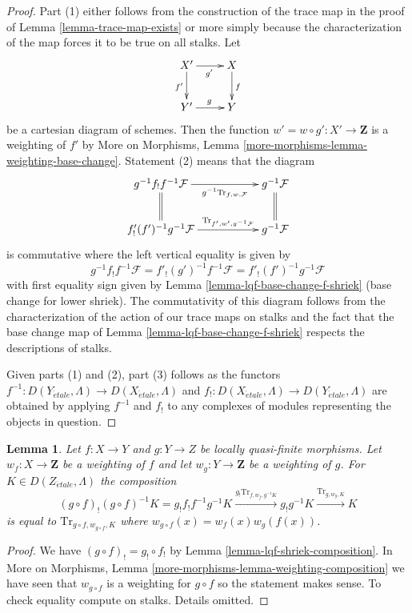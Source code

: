 \documentclass{stacks-project}
\theoremstyle{plain}
\newtheorem{lemma}[subsection]{Lemma}
\theoremstyle{definition}
\theoremstyle{remark}
\numberwithin{equation}{subsection}
\def\etale{{\acute{e}tale}}
\begin{document}
\begin{proof}
Part (1) either follows from the construction of the trace map
in the proof of Lemma \ref{lemma-trace-map-exists}
or more simply because the characterization of the map
forces it to be true on all stalks.
Let
$$
\xymatrix{
X' \ar[r]_{g'} \ar[d]_{f'} & X \ar[d]^f \\
Y' \ar[r]^g & Y
}
$$
be a cartesian diagram of schemes. Then the function
$w' = w \circ g' : X' \to \mathbf{Z}$ is a weighting of $f'$ by
More on Morphisms, Lemma \ref{more-morphisms-lemma-weighting-base-change}.
Statement (2) means that the diagram
$$
\xymatrix{
g^{-1}f_!f^{-1}\mathcal{F}
\ar[rr]_-{g^{-1}\text{Tr}_{f, w, \mathcal{F}}} \ar@{=}[d] & &
g^{-1}\mathcal{F} \ar@{=}[d] \\
f'_!(f')^{-1}g^{-1}\mathcal{F}
\ar[rr]^-{\text{Tr}_{f', w', g^{-1}\mathcal{F}}} & &
g^{-1}\mathcal{F}
}
$$
is commutative where the left vertical equality is given by
$$
g^{-1}f_!f^{-1}\mathcal{F} =
f'_!(g')^{-1}f^{-1}\mathcal{F} =
f'_!(f')^{-1}g^{-1}\mathcal{F}
$$
with first equality sign given by Lemma \ref{lemma-lqf-base-change-f-shriek}
(base change for lower shriek). The commutativity of this diagram
follows from the characterization of the action of our trace maps
on stalks and the fact that the base change map of
Lemma \ref{lemma-lqf-base-change-f-shriek} respects the descriptions of stalks.

\medskip\noindent
Given parts (1) and (2), part (3) follows as the functors
$f^{-1} : D(Y_\etale, \Lambda) \to D(X_\etale, \Lambda)$ and
$f_! : D(X_\etale, \Lambda) \to D(Y_\etale, \Lambda)$
are obtained by applying $f^{-1}$ and $f_!$ to any complexes
of modules representing the objects in question.
\end{proof}

\begin{lemma}
\label{lemma-trace-composition}
Let $f : X \to Y$ and $g : Y \to Z$ be locally quasi-finite morphisms.
Let $w_f : X \to \mathbf{Z}$ be a weighting of $f$ and let
$w_g : Y \to \mathbf{Z}$ be a weighting of $g$. For
$K \in D(Z_\etale, \Lambda)$ the composition
$$
(g \circ f)_!(g \circ f)^{-1}K =
g_! f_! f^{-1} g^{-1}K
\xrightarrow{g_! \text{Tr}_{f, w_f, g^{-1}K}}
g_!g^{-1}K
\xrightarrow{\text{Tr}_{g, w_g, K}}
K
$$
is equal to $\text{Tr}_{g \circ f, w_{g \circ f}, K}$ where
$w_{g \circ f}(x) = w_f(x) w_g(f(x))$.
\end{lemma}

\begin{proof}
We have $(g \circ f)_! = g_! \circ f_!$ by
Lemma \ref{lemma-lqf-shriek-composition}.
In More on Morphisms, Lemma \ref{more-morphisms-lemma-weighting-composition}
we have seen that $w_{g \circ f}$ is a weighting for $g \circ f$
so the statement makes sense. To check equality compute on stalks.
Details omitted.
\end{proof}
\end{document}
